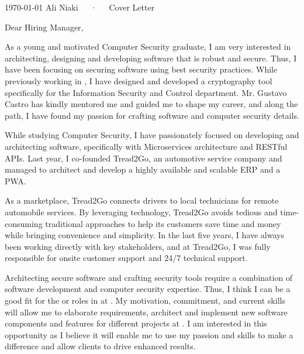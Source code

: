 \documentclass[11pt, letterpaper]{awesome-cv}
\begin{document}
\makecvheader[R]

\makecvfooter
  {\today}
  {Ali Niaki~~~·~~~Cover Letter}
  {}

\makelettertitle

\begin{cvletter}

  \begin{letterbodyen}
    Dear Hiring Manager,
    
    As a young and motivated Computer Security graduate, I am very interested in architecting, designing and developing software that is robust and secure. Thus, I have been focusing on securing software using best security practices. While previously working in \putcompanyname, I have designed and developed a cryptography tool specifically for the Information Security and Control department. Mr. Gustavo Castro has kindly mentored me and guided me to shape my career, and along the path, I have found my passion for crafting software and computer security details.

    While studying Computer Security, I have passionately focused on developing and architecting software, specifically with Microservices architecture and RESTful APIs. Last year, I co-founded Tread2Go, an automotive service company and managed to architect and develop a highly available and scalable ERP and a PWA.

    As a marketplace, Tread2Go connects drivers to local technicians for remote automobile services. By leveraging technology, Tread2Go avoids tedious and time-consuming traditional approaches to help its customers save time and money while bringing convenience and simplicity. In the last five years, I have always been working directly with key stakeholders, and at Tread2Go, I was fully responsible for onsite customer support and 24/7 technical support.

    Architecting secure software and crafting security tools require a combination of software development and computer security expertise. Thus, I think I can be a good fit for the  or  roles in  at \putcompanyname. My motivation, commitment, and current skills will allow me to elaborate requirements, architect and implement new software components and features for different projects at . I am interested in this opportunity as I believe it will enable me to use my passion and skills to make a difference and allow clients to drive enhanced results.


\end{letterbodyen}
\end{cvletter}
\end{document}
